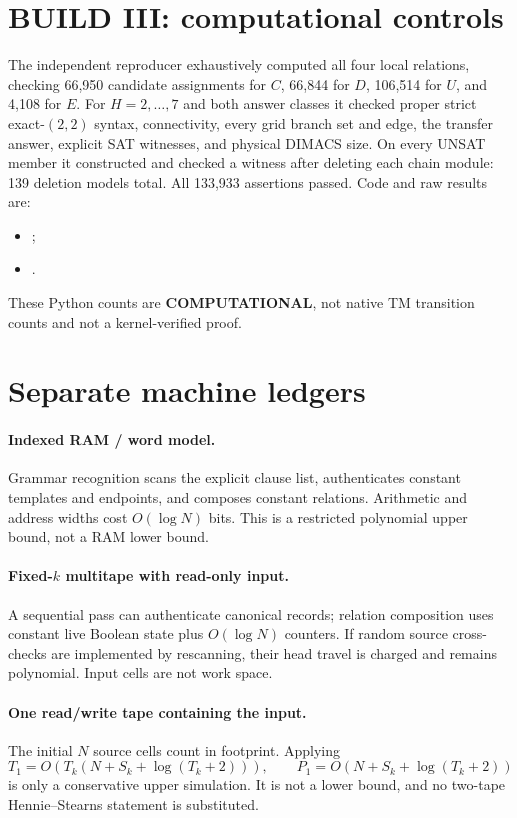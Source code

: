 \documentclass[11pt]{article}
\begin{document}
\section{BUILD III: computational controls}
The independent reproducer exhaustively computed all four local relations,
checking 66,950 candidate assignments for $C$, 66,844 for $D$, 106,514 for
$U$, and 4,108 for $E$.  For $H=2,\ldots,7$ and both answer classes it checked
proper strict exact-$(2,2)$ syntax, connectivity, every grid branch set and
edge, the transfer answer, explicit SAT witnesses, and physical DIMACS size.
On every UNSAT member it constructed and checked a witness after deleting
each chain module: 139 deletion models total.  All 133,933 assertions passed.
Code and raw results are:
\begin{itemize}
\item {};
\item {}.
\end{itemize}
These Python counts are \textbf{COMPUTATIONAL}, not native TM transition
counts and not a kernel-verified proof.

\section{Separate machine ledgers}
\paragraph{Indexed RAM / word model.}
Grammar recognition scans the explicit clause list, authenticates constant
templates and endpoints, and composes constant relations.  Arithmetic and
address widths cost $O(\log N)$ bits.  This is a restricted polynomial upper
bound, not a RAM lower bound.
\paragraph{Fixed-$k$ multitape with read-only input.}
A sequential pass can authenticate canonical records; relation composition
uses constant live Boolean state plus $O(\log N)$ counters.  If random source
cross-checks are implemented by rescanning, their head travel is charged and
remains polynomial.  Input cells are not work space.
\paragraph{One read/write tape containing the input.}
The initial $N$ source cells count in footprint.  Applying
\[
T_1=O(T_k(N+S_k+\log(T_k+2))),\qquad
P_1=O(N+S_k+\log(T_k+2))
\]
is only a conservative upper simulation.  It is not a lower bound, and no
two-tape Hennie--Stearns statement is substituted.
\end{document}
